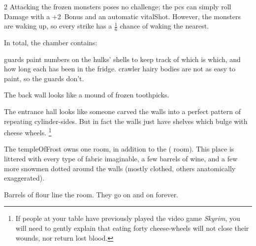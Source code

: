 \begin{multicols}{2}
Attacking the frozen \glspl{monster} poses no challenge; the \glspl{pc} can
simply roll Damage with a +2~Bonus and an automatic \gls{vitalShot}.  However,
the \glspl{monster} are waking up, so every strike has a $\frac{1}{6}$ chance
of waking the nearest.

In total, the chamber contains:


\Glspl{guard} paint numbers on the \glspl{hulk}' shells to keep track of which is which, and how long each has been in the fridge.
\Gls{crawler} hairy bodies are not as easy to paint, so the \glspl{guard} don't.

\chitincrawler



\chitincrawler

\begin{boxtext}
  The back wall looks like a mound of frozen toothpicks.
\end{boxtext}


\showStdSpells


The entrance hall looks like someone carved the walls into a perfect pattern of repeating cylinder-sides.
But in fact the walls just have shelves which bulge with cheese wheels.%
\footnote{If people at your table have previously played the video game \textit{Skyrim}, you will need to gently explain that eating forty cheese-wheels will not close their wounds, nor return lost blood.}


The \gls{templeOfFrost} owns one room, in addition to the  ( room).
This place is littered with every type of fabric imaginable, a few barrels of wine, and a few more snowmen dotted around the walls (mostly clothed, others anatomically exaggerated).


Barrels of flour line the room.
They go on and on forever.


\end{multicols}
